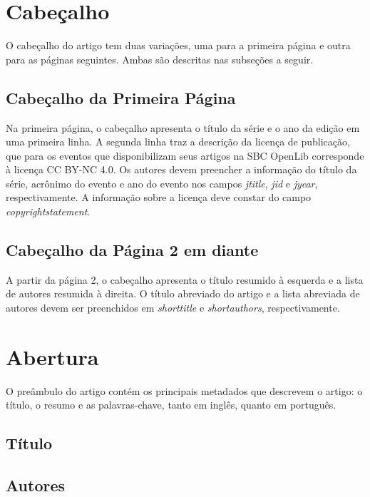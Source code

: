 \documentclass[english,notblind]{sbc20}
\begin{document}
\section{Cabeçalho}

O cabeçalho do artigo tem duas variações, uma para a primeira página e outra para as páginas seguintes. Ambas são descritas nas subseções a seguir.

\subsection{Cabeçalho da Primeira Página}

Na primeira página, o cabeçalho apresenta o título da série e o ano da edição em uma primeira linha. A segunda linha traz a descrição da licença de publicação, que para os eventos que disponibilizam seus artigos na SBC OpenLib corresponde à licença CC BY-NC 4.0. Os autores devem preencher a informação do título da série, acrônimo do evento e ano do evento nos campos \textit{jtitle}, \textit{jid} e \textit{jyear}, respectivamente. A informação sobre a licença deve constar do campo \textit{copyrightstatement}.

\subsection{Cabeçalho da Página 2 em diante}

A partir da página 2, o cabeçalho apresenta o título resumido à esquerda e a lista de autores resumida à direita. O título abreviado do artigo e a lista abreviada de autores devem ser preenchidos em \textit{shorttitle} e \textit{shortauthors}, respectivamente.

\section{Abertura}

O preâmbulo do artigo contém os principais metadados que descrevem o artigo: o título, o resumo e as palavras-chave, tanto em inglês, quanto em português.

\subsection{Título}

\subsection{Autores}
\end{document}
